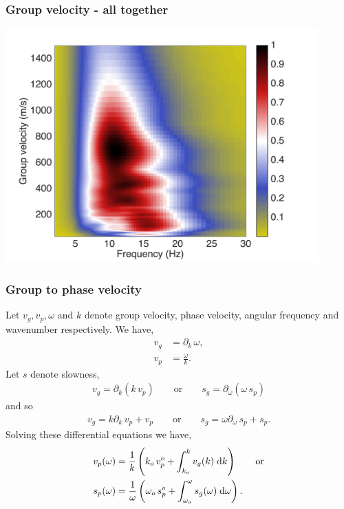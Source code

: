 \documentclass{beamer}
\begin{document}
\frame
{
\frametitle{{\bf Group velocity - all together}}
\centering
\includegraphics[width=0.9\textwidth]{../pics/group-velocity-onyva.png}
}
\frame
{
\frametitle{{\bf Group to phase velocity}}
Let $v_g,v_p,\omega$ and $k$ denote group velocity, phase velocity, angular frequency and wavenumber respectively. We have,
\begin{align*}
v_g &= \partial_k \, \omega, \\
v_p &= \frac{\omega}{k}.
\end{align*}
Let $s$ denote slowness,
\begin{align*}
v_g = \partial_k(k\,v_p) \hspace{2em} \text{or} \hspace{2em} s_g = \partial_\omega(\omega \, s_p)
\end{align*}
and so
\begin{align*}
v_g = k\partial_k \,v_p +  v_p \hspace{2em} \text{or} \hspace{2em} s_g = \omega\partial_\omega \, s_p + s_p.
\end{align*}
Solving these differential equations we have,
\begin{align*}
v_p(\omega) &= \frac{1}{k}\left( k_o\, v_p^o + \int_{k_o}^{k} v_g(k)\;{\rm d}k \right) 
\hspace{2em} 
\text{or} \\
s_p(\omega) &= \frac{1}{\omega}\left( \omega_o\, s_p^o + \int_{\omega_o}^{\omega} s_g(\omega)\;{\rm d}\omega \right).
\end{align*}
}
\end{document}
